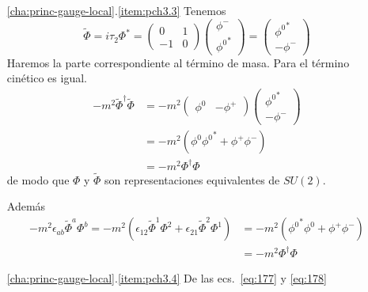\begin{itemize}
\item[\ref{cha:princ-gauge-local}.\ref{item:pch3.3}] 
Tenemos  
\begin{equation}
  \tilde\Phi=i\tau_2\Phi^*=\begin{pmatrix}
    0&  1\\
    -1& 0
  \end{pmatrix}
  \begin{pmatrix}
\phi^-\\
{\phi^0}^*    
  \end{pmatrix}=
  \begin{pmatrix}
    {\phi^0}^*\\
    -\phi^-
  \end{pmatrix}
\end{equation}
Haremos la parte correspondiente al t\'ermino de masa. Para el t\'ermino cin\'etico es igual.
\begin{align}
  -m^2\tilde\Phi^\dagger \tilde\Phi
&=-m^2
\begin{pmatrix}
  {\phi^0}&-\phi^+
\end{pmatrix}
\begin{pmatrix}
  {\phi^0}^*\\
  -\phi^-
\end{pmatrix}\nonumber\\
&=-m^2(\phi^0{\phi^0}^*+\phi^+\phi^-)\nonumber\\
&=-m^2\Phi^\dagger \Phi
\end{align}
de modo que $\Phi$ y $\tilde \Phi$ son representaciones equivalentes de $SU(2)$.

Adem\'as
  \begin{align}
   -m^2\epsilon_{ab}\tilde \Phi^a\Phi^b= -m^2(\epsilon_{12}\tilde\Phi^1\Phi^2+\epsilon_{21}\tilde\Phi^2\Phi^1)
    &=-m^2({\phi^0}^*\phi^0+\phi^+\phi^-)\nonumber\\
    &=-m^2\Phi^\dagger \Phi 
  \end{align}
\item[\ref{cha:princ-gauge-local}.\ref{item:pch3.4}] De las ecs.~\eqref{eq:177} y \eqref{eq:178}


\end{itemize}
